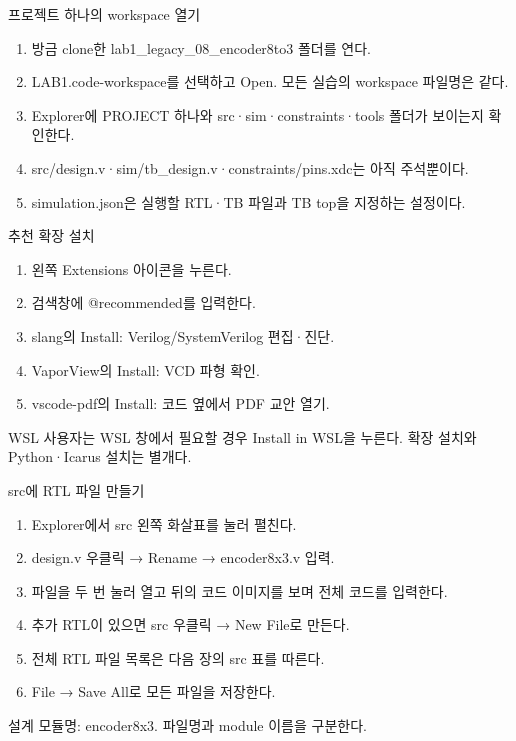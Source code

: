\begin{frame}{프로젝트 하나의 workspace 열기}\relax
\small
\begin{enumerate}\setlength{\itemsep}{0.22cm}
\item 방금 clone한 lab1\_legacy\_08\_encoder8to3 폴더를 연다.
\item LAB1.code-workspace를 선택하고 Open. 모든 실습의 workspace 파일명은 같다.
\item Explorer에 PROJECT 하나와 src·sim·constraints·tools 폴더가 보이는지 확인한다.
\item src/design.v·sim/tb\_design.v·constraints/pins.xdc는 아직 주석뿐이다.
\item simulation.json은 실행할 RTL·TB 파일과 TB top을 지정하는 설정이다.
\end{enumerate}

\end{frame}

\begin{frame}{추천 확장 설치}\relax
\small
\begin{enumerate}\setlength{\itemsep}{0.22cm}
\item 왼쪽 Extensions 아이콘을 누른다.
\item 검색창에 @recommended를 입력한다.
\item slang의 Install: Verilog/SystemVerilog 편집·진단.
\item VaporView의 Install: VCD 파형 확인.
\item vscode-pdf의 Install: 코드 옆에서 PDF 교안 열기.
\end{enumerate}
WSL 사용자는 WSL 창에서 필요할 경우 Install in WSL을 누른다. 확장 설치와 Python·Icarus 설치는 별개다.\par
\end{frame}

\begin{frame}{src에 RTL 파일 만들기}\relax
\small
\begin{enumerate}\setlength{\itemsep}{0.22cm}
\item Explorer에서 src 왼쪽 화살표를 눌러 펼친다.
\item design.v 우클릭 → Rename → encoder8x3.v 입력.
\item 파일을 두 번 눌러 열고 뒤의 코드 이미지를 보며 전체 코드를 입력한다.
\item 추가 RTL이 있으면 src 우클릭 → New File로 만든다.
\item 전체 RTL 파일 목록은 다음 장의 src 표를 따른다.
\item File → Save All로 모든 파일을 저장한다.
\end{enumerate}
설계 모듈명: encoder8x3. 파일명과 module 이름을 구분한다.\par
\end{frame}

